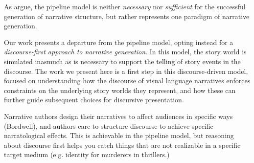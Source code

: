 
As \citeauthor{ronfard2014story} argue, the pipeline model is neither \emph{necessary} nor \emph{sufficient} for the successful generation of narrative structure, but rather represents one paradigm of narrative generation. 




Our work presents a departure from the pipeline model, opting instead for a \emph{discourse-first approach to narrative generation}. In this model, the story world is simulated inasmuch as is necessary to support the telling of story events in the discourse. The work we present here is a first step in this discourse-driven model, focused on understanding how the discourse of visual language narratives enforces constraints on the underlying story worlds they represent, and how these can further guide subsequent choices for discursive presentation.

Narrative authors design their narratives to affect audiences in specific ways (Bordwell), and authors care to structure discourse to achieve specific narratological effects.  This is achievable in the pipeline model, but reasoning about discourse first helps you catch things that are not realizable in a specific target medium (e.g. identity for murderers in thrillers.)



